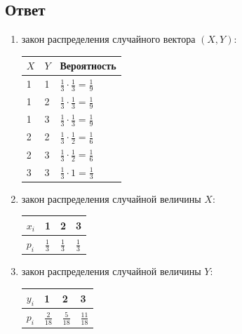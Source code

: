 \subsection*{Ответ}
\begin{enumerate}
    \item закон распределения случайного вектора $\left ( X, Y \right )$:

    \begin{tabular}{|p{1cm}|p{1cm}|p{3cm}|}
        \hline
        $X$ & $Y$ & Вероятность                                   \\
        \hline
        \hline
        1   & 1   & $\frac{1}{3} \cdot \frac{1}{3} = \frac{1}{9}$ \\
        \hline
        1   & 2   & $\frac{1}{3} \cdot \frac{1}{3} = \frac{1}{9}$ \\
        \hline
        1   & 3   & $\frac{1}{3} \cdot \frac{1}{3} = \frac{1}{9}$ \\
        \hline
        2   & 2   & $\frac{1}{3} \cdot \frac{1}{2} = \frac{1}{6}$ \\
        \hline
        2   & 3   & $\frac{1}{3} \cdot \frac{1}{2} = \frac{1}{6}$ \\
        \hline
        3   & 3   & $\frac{1}{3} \cdot 1 = \frac{1}{3}$           \\
        \hline
    \end{tabular}

    \item закон распределения случайной величины $X$:

    \begin{tabular}{|p{1cm}|p{1cm}|p{1cm}|p{1cm}|}
        \hline
        $x_i$ & 1             & 2             & 3             \\
        \hline
        $p_i$ & $\frac{1}{3}$ & $\frac{1}{3}$ & $\frac{1}{3}$ \\
        \hline
    \end{tabular}

    \item закон распределения случайной величины $Y$:

    \begin{tabular}{|p{1cm}|p{1cm}|p{1cm}|p{1cm}|}
        \hline
        $y_i$ & 1              & 2              & 3               \\
        \hline
        $p_i$ & $\frac{2}{18}$ & $\frac{5}{18}$ & $\frac{11}{18}$ \\
        \hline
    \end{tabular}


\end{enumerate}
